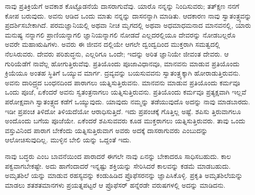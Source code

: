 ನಾವು ಪ್ರತಿಕ್ರಿಯೆಗೆ ಅವಕಾಶ ಕೊಟ್ಟೊಡನೆಯೆ ದಾಸರಾಗುವೆವು. ಯಾರೊ ನನ್ನನ್ನು ನಿಂದಿಸುವರು; ತತ್​ಕ್ಷಣ ನನಗೆ ಕೋಪ ಬರುವುದು. ಅವನು ಆಡಿದ ಒಂದು ಮಾತು ನನ್ನನ್ನು ದಾಸನನ್ನಾಗಿ ಮಾಡಿತು. ಆದಕಾರಣ ನಾವು ಸ್ವಾತಂತ್ರ್ಯವನ್ನು ಪ್ರದರ್ಶಿಸಬೇಕಾಗಿದೆ. ಪರಮಜ್ಞಾನಿಯಲ್ಲಿ ಅಥವಾ ನೀಚ ಮೃಗದಲ್ಲಿ ಅಥವಾ ಅಧಮಾಧಮನಾದ ಮಾನವನಲ್ಲಿ, ಯಾರು ಮನುಷ್ಯ ನನ್ನಾಗಲಿ ಪ್ರಾಣಿಯನ್ನಾಗಲಿ ಜ್ಞಾನಿಯನ್ನಾಗಲಿ ನೋಡದೆ ಎಲ್ಲದರಲ್ಲಿಯೂ ದೇವರನ್ನು ನೋಡಬಲ್ಲರೊ ಅವರೇ ಮಹಾಋಷಿಗಳು. ಅವರು ಈ ಜೀವನ ದಲ್ಲಿಯೇ ಆಗಲೇ ದ್ವಂದ್ವದಿಂದ ಮುಕ್ತರಾಗಿ ಸಮತ್ವದಲ್ಲಿ ನೆಲಸಿರುವರು. ದೇವರು ಪರಿಶುದ್ಧನು, ಎಲ್ಲರಿಗೂ ಒಂದೇ; ಇದನ್ನು ಅರಿತ ಜ್ಞಾನಿಯೇ ಜೀವಂತ ದೇವರು. ಆ ಗುರಿಯೆಡೆಗೆ ನಾವೆಲ್ಲ ಹೋಗುತ್ತಿರುವೆವು. ಪ್ರತಿಯೊಂದು ಪೂಜಾವಿಧಾನವೂ, ಮಾನವನು ಮಾಡುವ ಪ್ರತಿಯೊಂದು ಕ್ರಿಯೆಯೂ ಅಂತಹ ಸ್ಥಿತಿಗೆ ಒಯ್ಯುವ ಮಾರ್ಗ. ದ್ರವ್ಯವನ್ನು ಬಯಸುವವನು ಸ್ವಾತಂತ್ರ್ಯಕ್ಕಾಗಿ ಹೋರಾಡುತ್ತಿರುವನು. ಅವನು ದಾರಿದ್ರ್ಯದ ಬಂಧನದಿಂದ ಪಾರಾಗಲು ಯತ್ನಿಸುತ್ತಿರುವನು. ಮಾನವನು ಮಾಡುವ ಪ್ರತಿಯೊಂದು ಕರ್ಮವೂ ಒಂದು ಪೂಜೆ, ಏಕೆಂದರೆ ಅವನು ಸ್ವತಂತ್ರನಾಗಲು ಯತ್ನಿಸುತ್ತಿರುವನು. ಪ್ರತಿಯೊಂದು ಕರ್ಮವೂ ಪ್ರತ್ಯಕ್ಷವಾಗಿ ಇಲ್ಲವೆ ಪರೋಕ್ಷವಾಗಿ ಸ್ವಾತಂತ್ರ್ಯದ ಕಡೆಗೆ ಒಯ್ಯುವುದು. ಯಾವುದು ನಮ್ಮನ್ನು ತಡೆಯುವುದೊ ಅದನ್ನು ನಾವು ಮಾಡಬಾರದು. ಇಡೀ ಪ್ರಪಂಚ ತಿಳಿದೋ ತಿಳಿಯದೆಯೋ ಆರಾಧಿಸುತ್ತಿದೆ. ಇದು ಪ್ರಪಂಚಕ್ಕೆ ಗೊತ್ತಿಲ್ಲ ಅಷ್ಟೆ. ಶಪಿಸು ತ್ತಿರುವಾಗಲೂ ಅಂದೊಂದು ಬಗೆಯ ಪೂಜೆಯೇ. ಏಕೆಂದರೆ ಶಪಿಸುವವರು ಕೂಡ ಮುಕ್ತರಾಗಲು ಯತ್ನಿಸುತ್ತಿರುವರು. ತಾವು ಒಂದು ವಸ್ತುವಿನಿಂದ ಪಾರಾಗ ಬೇಕೆಂದು ಯತ್ನಿಸುತ್ತಿರುವಾಗ ಅವರು ಅದಕ್ಕೆ ದಾಸರಾಗುವರು ಎಂಬುದನ್ನು ಆಲೋಚಿಸುವುದಿಲ್ಲ. ಮುಳ್ಳಿನ ಬೇಲಿ ಯನ್ನು ಒದ್ದಂತೆ ಇದು.

ನಾವು ಬದ್ಧರು ಎಂಬ ಬಾವನೆಯಿಂದ ಪಾರಾದರೆ ಈಗಲೇ ನಾವು ಏನನ್ನು ಬೇಕಾದರೂ ಸಾಧಿಸಬಹುದು. ಕಾಲ ಪಕ್ವವಾಗಬೇಕಷ್ಟೇ. ಅದು ಹಾಗೆಂದಾದರೆ ಇನ್ನಷ್ಟು ಶಕ್ತಿಯನ್ನು ಸೇರಿಸಿದರೆ ಕಾಲವನ್ನು ಕಡಮೆ ಮಾಡಬಹುದು. ಅಮೃತಶಿಲೆ ಯನ್ನು ಮಾಡುವ ರಹಸ್ಯವನ್ನು ಕಂಡುಹಿಡಿದ ಪ್ರೊಫೆಸರನನ್ನು ಜ್ಞಾಪಿಸಿಕೊಳ್ಳಿ. ಪ್ರಕೃತಿ ಅಮೃತಶಿಲೆಯನ್ನು ಮಾಡಲು ಶತಶತಮಾನಗಳು ಪ್ರಯತ್ನಪಟ್ಟರೆ ಆ ಪ್ರೊಫೆಸರ್​ ಹನ್ನೆರಡೇ ವರುಷಗಳಲ್ಲಿ ಅದನ್ನು ಮಾಡಿದನು.

